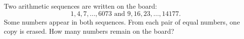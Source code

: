 Two arithmetic sequences are written on the board: \[1, 4, 7, \ldots, 6073 \text{ and } 9, 16, 23, \dots, 14177.\]Some numbers appear in both sequences. From each pair of equal numbers, one copy is erased. How many numbers remain on the board?
